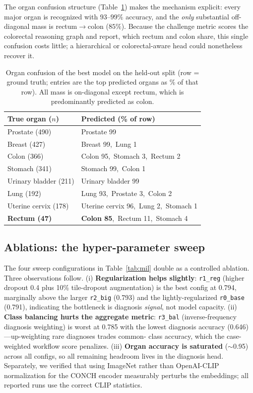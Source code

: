 \documentclass[11pt,a4paper]{article}
\newcommand{\code}[1]{\texttt{\small #1}}
\begin{document}
The organ confusion structure (Table~\ref{tab:confusion}) makes the mechanism explicit: every
major organ is recognized with $93$--$99\%$ accuracy, and the \emph{only} substantial off-
diagonal mass is rectum$\rightarrow$colon ($85\%$). Because the challenge metric scores the
colorectal reasoning graph and report, which rectum and colon share, this single confusion costs
little; a hierarchical or colorectal-aware head could nonetheless recover it.

\begin{table}[h]
\centering
\caption{Organ confusion of the best model on the held-out split (row = ground truth; entries
are the top predicted organs as \% of that row). All mass is on-diagonal except rectum, which is
predominantly predicted as colon.}
\label{tab:confusion}
\begin{tabular}{ll}
\toprule
True organ ($n$) & Predicted (\% of row) \\
\midrule
Prostate (490)        & Prostate 99 \\
Breast (427)          & Breast 99,\ Lung 1 \\
Colon (366)           & Colon 95,\ Stomach 3,\ Rectum 2 \\
Stomach (341)         & Stomach 99,\ Colon 1 \\
Urinary bladder (211) & Urinary bladder 99 \\
Lung (192)            & Lung 93,\ Prostate 3,\ Colon 2 \\
Uterine cervix (178)  & Uterine cervix 96,\ Lung 2,\ Stomach 1 \\
\textbf{Rectum (47)}  & \textbf{Colon 85},\ Rectum 11,\ Stomach 4 \\
\bottomrule
\end{tabular}
\end{table}

\subsection{Ablations: the hyper-parameter sweep}
The four sweep configurations in Table~\ref{tab:mil} double as a controlled ablation. Three
observations follow. (i) \textbf{Regularization helps slightly}: \code{r1\_reg} (higher dropout
0.4 plus 10\% tile-dropout augmentation) is the best config at 0.794, marginally above the
larger \code{r2\_big} (0.793) and the lightly-regularized \code{r0\_base} (0.791), indicating
the bottleneck is diagnosis \emph{signal}, not model capacity. (ii) \textbf{Class balancing
hurts the aggregate metric}: \code{r3\_bal} (inverse-frequency diagnosis weighting) is worst at
0.785 with the lowest diagnosis accuracy (0.646)---up-weighting rare diagnoses trades common-
class accuracy, which the case-weighted workflow score penalizes. (iii) \textbf{Organ accuracy
is saturated} ($\sim$0.95) across all configs, so all remaining headroom lives in the diagnosis
head. Separately, we verified that using ImageNet rather than OpenAI-CLIP normalization for the
CONCH encoder measurably perturbs the embeddings; all reported runs use the correct CLIP
statistics.
\end{document}
